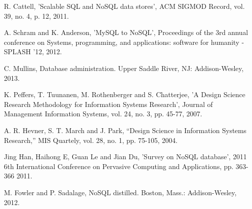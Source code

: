 \begin{thebibliography}{69}


 R. Cattell, 'Scalable SQL and NoSQL data stores', ACM SIGMOD Record, vol. 39, no. 4, p. 12, 2011.

 A. Schram and K. Anderson, 'MySQL to NoSQL', Proceedings of the 3rd annual conference on Systems, programming, and applications: software for humanity - SPLASH '12, 2012.

 C. Mullins, Database administration. Upper Saddle River, NJ: Addison-Wesley, 2013.

 K.  Peffers, T.  Tuunanen, M.  Rothenberger and S.  Chatterjee, 'A Design Science Research Methodology for Information Systems Research', Journal of Management Information Systems, vol. 24, no. 3, pp. 45-77, 2007.




 A. R. Hevner, S. T. March and J. Park, “Design Science in Information Systems
Research,” MIS Quartely, vol. 28, no. 1, pp. 75-105, 2004.


 Jing Han, Haihong E, Guan Le and Jian Du, 'Survey on NoSQL database', 2011 6th International Conference on Pervasive Computing and Applications, pp. 363-366 2011.

 M. Fowler and P. Sadalage, NoSQL distilled. Boston, Mass.: Addison-Wesley, 2012.


\end{thebibliography}
